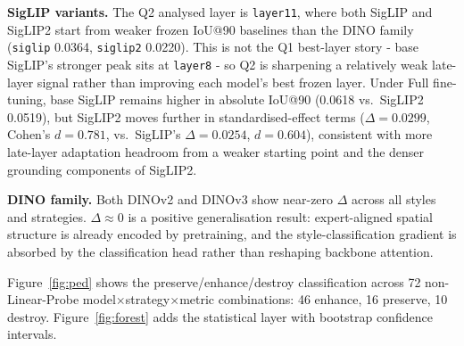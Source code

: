 \documentclass{article}
\newlength{\reportcolwidth}
\begin{document}
\begin{table}[h]
\centering
\caption{Per-feature $\Delta$IoU for MAE (Full fine-tuning, Renaissance images).}
\label{tab:mae_renaissance}
\end{table}

\textbf{SigLIP variants.} The Q2 analysed layer is \texttt{layer11}, where
both SigLIP and SigLIP2 start from weaker frozen IoU@90 baselines than the
DINO family (\texttt{siglip} 0.0364, \texttt{siglip2} 0.0220). This is not
the Q1 best-layer story - base SigLIP's stronger peak sits at \texttt{layer8}
- so Q2 is sharpening a relatively weak late-layer signal rather than
improving each model's best frozen layer. Under Full fine-tuning, base SigLIP
remains higher in absolute IoU@90 (0.0618 vs.\ SigLIP2 0.0519), but SigLIP2
moves further in standardised-effect terms ($\Delta\!=\!0.0299$, Cohen's
$d\!=\!0.781$, vs.\ SigLIP's $\Delta\!=\!0.0254$, $d\!=\!0.604$), consistent
with more late-layer adaptation headroom from a weaker starting point and the
denser grounding components of SigLIP2.

\textbf{DINO family.} Both DINOv2 and DINOv3 show near-zero $\Delta$ across all
styles and strategies. $\Delta\!\approx\!0$ is a positive generalisation result:
expert-aligned spatial structure is already encoded by pretraining, and the
style-classification gradient is absorbed by the classification head rather than
reshaping backbone attention.

Figure~\ref{fig:ped} shows the preserve/enhance/destroy classification across
72 non-Linear-Probe model$\times$strategy$\times$metric combinations: 46 enhance,
16 preserve, 10 destroy. Figure~\ref{fig:forest} adds the statistical layer with
bootstrap confidence intervals.
\end{document}
